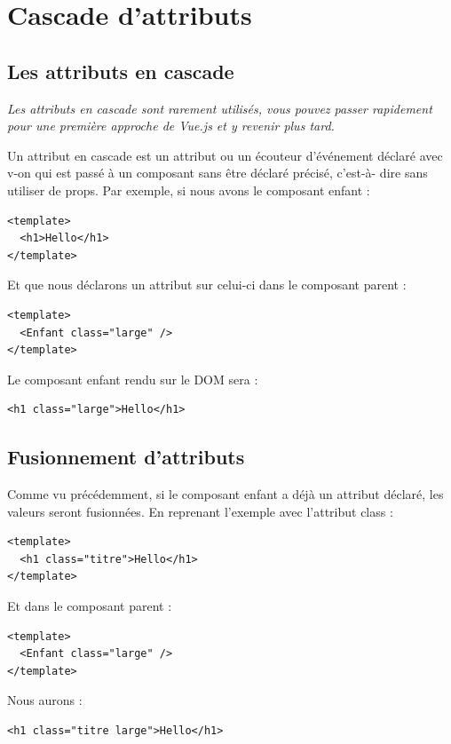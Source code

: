 \documentclass{article}
\begin{document}


\section{Cascade d'attributs}
\subsection{Les attributs en cascade}
{\em Les attributs en cascade sont rarement utilisés, vous pouvez passer rapidement pour une première approche de {\color{monOrange}Vue.js} et y revenir plus tard.}

Un attribut en cascade est un attribut ou un écouteur d'événement déclaré avec {\color{monOrange}v-on} qui est passé à un composant sans être déclaré précisé, c'est-à- dire sans utiliser de {\color{monOrange}props}. Par exemple, si nous avons le composant enfant :
\begin{verbatim}
<template>
  <h1>Hello</h1>
</template>
\end{verbatim}
Et que nous déclarons un attribut sur celui-ci dans le composant parent :
\begin{verbatim}
<template>
  <Enfant class="large" />
</template>
\end{verbatim}
Le composant enfant rendu sur le DOM sera :
\begin{verbatim}
<h1 class="large">Hello</h1>
\end{verbatim}
\subsection{Fusionnement d'attributs}
Comme vu précédemment, si le composant enfant a déjà un attribut déclaré, les valeurs seront fusionnées. En reprenant l'exemple avec l'attribut {\color{monOrange}class} :
\begin{verbatim}
<template>
  <h1 class="titre">Hello</h1>
</template>
\end{verbatim}
Et dans le composant parent :
\begin{verbatim}
<template>
  <Enfant class="large" />
</template>
\end{verbatim}
Nous aurons :
\begin{verbatim}
<h1 class="titre large">Hello</h1>
\end{verbatim}
\end{document}
